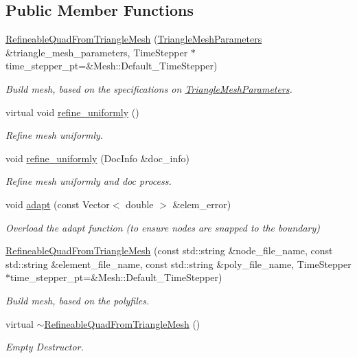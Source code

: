 \subsection*{Public Member Functions}
\begin{DoxyCompactItemize}
\item 
\hyperlink{classoomph_1_1RefineableQuadFromTriangleMesh_a76122fefb9de7f79d3f8093f730c3dd4}{Refineable\+Quad\+From\+Triangle\+Mesh} (\hyperlink{classoomph_1_1TriangleMeshParameters}{Triangle\+Mesh\+Parameters} \&triangle\+\_\+mesh\+\_\+parameters, Time\+Stepper $\ast$time\+\_\+stepper\+\_\+pt=\&Mesh\+::\+Default\+\_\+\+Time\+Stepper)
\begin{DoxyCompactList}\small\item\em Build mesh, based on the specifications on \hyperlink{classoomph_1_1TriangleMeshParameters}{Triangle\+Mesh\+Parameters}. \end{DoxyCompactList}\item 
virtual void \hyperlink{classoomph_1_1RefineableQuadFromTriangleMesh_a73e88bb8c1cc8464f079e928e89a4a14}{refine\+\_\+uniformly} ()
\begin{DoxyCompactList}\small\item\em Refine mesh uniformly. \end{DoxyCompactList}\item 
void \hyperlink{classoomph_1_1RefineableQuadFromTriangleMesh_ab78f50c13f9ccf7d1f359bc443fe2a9d}{refine\+\_\+uniformly} (Doc\+Info \&doc\+\_\+info)
\begin{DoxyCompactList}\small\item\em Refine mesh uniformly and doc process. \end{DoxyCompactList}\item 
void \hyperlink{classoomph_1_1RefineableQuadFromTriangleMesh_a7d2efa292dd5dd4930e661fd32e42eec}{adapt} (const Vector$<$ double $>$ \&elem\+\_\+error)
\begin{DoxyCompactList}\small\item\em Overload the adapt function (to ensure nodes are snapped to the boundary) \end{DoxyCompactList}\item 
\hyperlink{classoomph_1_1RefineableQuadFromTriangleMesh_aa2607a703a228947cc65d9edf0ca8b0e}{Refineable\+Quad\+From\+Triangle\+Mesh} (const std\+::string \&node\+\_\+file\+\_\+name, const std\+::string \&element\+\_\+file\+\_\+name, const std\+::string \&poly\+\_\+file\+\_\+name, Time\+Stepper $\ast$time\+\_\+stepper\+\_\+pt=\&Mesh\+::\+Default\+\_\+\+Time\+Stepper)
\begin{DoxyCompactList}\small\item\em Build mesh, based on the polyfiles. \end{DoxyCompactList}\item 
virtual \hyperlink{classoomph_1_1RefineableQuadFromTriangleMesh_aaa5c1de240765e38b30f2a10613faf59}{$\sim$\+Refineable\+Quad\+From\+Triangle\+Mesh} ()
\begin{DoxyCompactList}\small\item\em Empty Destructor. \end{DoxyCompactList}\end{DoxyCompactItemize}
